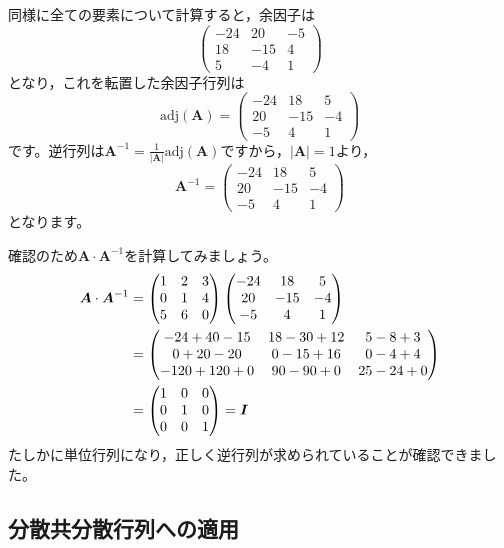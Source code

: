 \documentclass[dvipsnames]{ltjsarticle}
\begin{document}
同様に全ての要素について計算すると，余因子は
\[
\begin{pmatrix}
-24 & 20 & -5 \\
18 & -15 & 4 \\
5 & -4 & 1
\end{pmatrix}
\]
となり，これを転置した余因子行列は
\[
\text{adj}(\bm{A}) = \begin{pmatrix}
-24 & 18 & 5 \\
20 & -15 & -4 \\
-5 & 4 & 1
\end{pmatrix}
\]
です。逆行列は$\bm{A}^{-1} = \frac{1}{|\bm{A}|} \text{adj}(\bm{A})$ですから，$|\bm{A}|=1$より，
\[
\bm{A}^{-1} = \begin{pmatrix}
-24 & 18 & 5 \\
20 & -15 & -4 \\
-5 & 4 & 1
\end{pmatrix}
\]
となります。

確認のため$\bm{A} \cdot \bm{A}^{-1}$を計算してみましょう。
\begin{align}
\bm{A} \cdot \bm{A}^{-1} &= \begin{pmatrix}
1 & 2 & 3 \\
0 & 1 & 4 \\
5 & 6 & 0
\end{pmatrix}
\begin{pmatrix}
-24 & 18 & 5 \\
20 & -15 & -4 \\
-5 & 4 & 1
\end{pmatrix} \notag \\
&= \begin{pmatrix}
-24+40-15 & 18-30+12 & 5-8+3 \\
0+20-20 & 0-15+16 & 0-4+4 \\
-120+120+0 & 90-90+0 & 25-24+0
\end{pmatrix} \notag \\
&= \begin{pmatrix}
1 & 0 & 0 \\
0 & 1 & 0 \\
0 & 0 & 1
\end{pmatrix} = \bm{I}
\end{align}
たしかに単位行列になり，正しく逆行列が求められていることが確認できました。

\subsection{分散共分散行列への適用}
\end{document}

